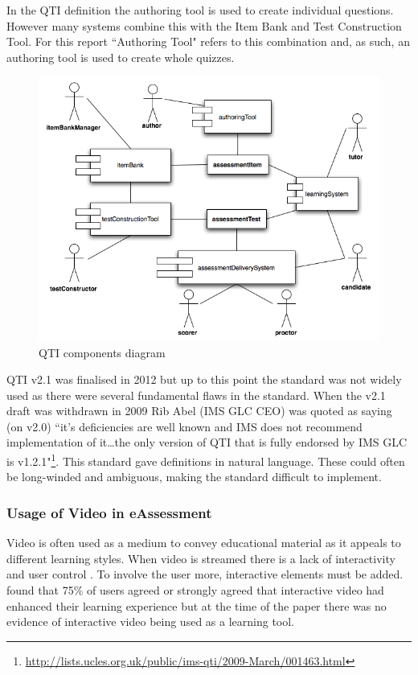 In the QTI definition the authoring tool is used to create individual questions. However many systems combine this with the Item Bank and Test Construction Tool. For this report ``Authoring Tool" refers to this combination and, as such, an authoring tool is used to create whole quizzes.

\begin{figure}[h]
	\centering 
		\includegraphics[scale=0.5]{../figures/componentsQTI.png} 		
	\caption{\label{Figure: QTI components} QTI components diagram \citep{qtiOverview}} 	
\end{figure}

QTI v2.1 was finalised in 2012 \citep{qtiOverview} but up to this point the standard was not widely used \citep{eps265979} as there were several fundamental flaws in the standard. When the v2.1 draft was withdrawn in 2009 Rib Abel (IMS GLC CEO) was quoted as saying (on v2.0) ``it’s deficiencies are well known and IMS does not recommend implementation of it\dots the only version of QTI that is fully endorsed by IMS GLC is v1.2.1"\footnote{\url{http://lists.ucles.org.uk/public/ims-qti/2009-March/001463.html}}. This standard gave definitions in natural language. These could often be long-winded and ambiguous, making the standard difficult to implement\citep{failQTI, Sclater2007}.


\subsubsection{Usage of Video in eAssessment}
\label{Subsubsection:Usage of Video in eAssessment}
Video is often used as a medium to convey educational material as it appeals to different learning styles. When video is streamed there is a lack of interactivity and user control \citep{eps267281}. To involve the user more, interactive elements must be added. \cite{eps267281} found that 75\% of users agreed or strongly agreed that interactive video had enhanced their learning experience but at the time of the paper there was no evidence of interactive video being used as a learning tool.

